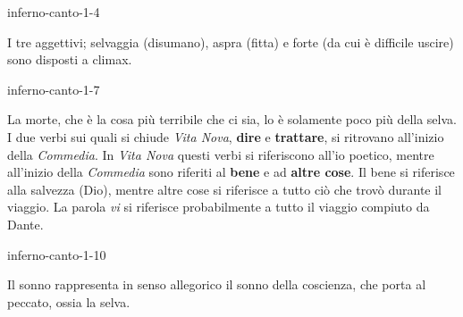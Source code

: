 \documentclass[preview]{standalone}
\begin{document}
\begin{snippet}{inferno-canto-1-4}

    I tre aggettivi; selvaggia (disumano), aspra (fitta) e forte (da cui è difficile uscire)
    sono disposti a climax.
\end{snippet}

\begin{snippet}{inferno-canto-1-7}
    
    La morte, che è la cosa più terribile che ci sia, lo è solamente poco più della selva.
    \\
    I due verbi sui quali si chiude \textit{Vita Nova},
    \textbf{dire} e \textbf{trattare}, si ritrovano all'inizio della \textit{Commedia}.
    In \textit{Vita Nova} questi verbi si riferiscono all'io poetico, mentre all'inizio della \textit{Commedia}
    sono riferiti al \textbf{bene} e ad \textbf{altre cose}.
    Il bene si riferisce alla salvezza (Dio), mentre altre cose si riferisce a tutto ciò che trovò durante il viaggio.
    La parola \textit{vi} si riferisce probabilmente a tutto il viaggio compiuto da Dante.
\end{snippet}

\begin{snippet}{inferno-canto-1-10}
    
    Il sonno rappresenta in senso allegorico il sonno della coscienza,
    che porta al peccato, ossia la selva.
\end{snippet}
\end{document}

